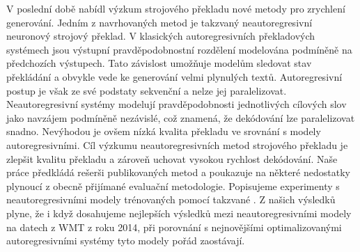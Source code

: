 V poslední době nabídl výzkum strojového překladu nové metody pro zrychlení
generování.
%
Jedním z navrhovaných metod je takzvaný neautoregresivní neuronový strojový
překlad.
%
V klasických autoregresivních překladových systémech jsou výstupní
pravděpodobnostní rozdělení modelována podmíněně na předchozích výstupech.
%
Tato závislost umožňuje modelům sledovat stav překládání a obvykle vede ke
generování velmi plynulých textů.
%
Autoregresivní postup je však ze své podstaty sekvenční a nelze jej
paralelizovat.
%
Neautoregresivní systémy modelují pravděpodobnosti jednotlivých cílových slov
jako navzájem podmíněně nezávislé, což znamená, že dekódování lze paralelizovat
snadno.
%
Nevýhodou je ovšem nízká kvalita překladu ve srovnání s modely
autoregresivními.
%
Cíl výzkumu neautoregresivních metod strojového překladu je zlepšit kvalitu
překladu a zároveň uchovat vysokou rychlost dekódování.
%
Naše práce předkládá rešerši publikovaných metod a poukazuje na některé
nedostatky plynoucí z obecně přijímané evaluační metodologie.
%
Popisujeme experimenty s neautoregresivními modely trénovaných pomocí takzvané
.
%
Z našich výsledků plyne, že i když dosahujeme nejlepších výsledků mezi
neautoregresivními modely na datech z WMT z roku 2014, při porovnání s
nejnovějšími optimalizovanými autoregresivními systémy tyto modely pořád
zaostávají.



